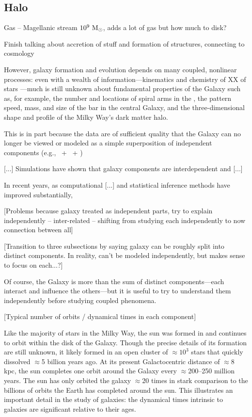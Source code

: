 \subsection{Halo} 

Gas -- Magellanic stream $10^9~\mathrm{M}_\odot$, adds a lot of gas but how much to disk?

Finish talking about accretion of stuff and formation of structures, connecting to cosmology


However, galaxy formation and evolution depends on many coupled, nonlinear processes: even with a wealth of information---kinematics and chemistry of XX of stars \citep{todo}---much is still unknown about fundamental properties of the Galaxy such as, for example, the number and locations of spiral arms in the \mwdisk, the pattern speed, mass, and size of the bar in the central Galaxy, and the three-dimensional shape and profile of the Milky Way's dark matter halo. 

This is in part because the data are of sufficient quality that the Galaxy can no longer be viewed or modeled as a simple superposition of independent components (e.g., \mwdisk\ + \mwbulge\ + \mwhalo)

[...] Simulations have shown that galaxy components are interdependent and [...] \citep{todo}

In recent years, as computational [...] and statistical inference methods have improved substantially, 

[Problems because galaxy treated as independent parts, try to explain independently -- inter-related -- shifting from studying each independently to now connection between all]

[Transition to three subsections by saying galaxy can be roughly split into distinct components. In reality, can't be modeled independently, but makes sense to focus on each...?]


Of course, the Galaxy is more than the sum of distinct components---each interact and influence the others---but it is useful to try to understand them independently before studying coupled phenomena. 



[Typical number of orbits / dynamical times in each component]

Like the majority of stars in the Milky Way, the sun was formed in and continues to orbit within the disk of the Galaxy. Though the precise details of its formation are still unknown, it likely formed in an open cluster of $\approx$$10^3$ stars that quickly dissolved $\approx$5 billion years ago. At its present Galactocentric distance of $\approx$8 kpc, the sun completes one orbit around the Galaxy every $\approx$200--250 million years. The sun has only orbited the galaxy $\approx$20 times in stark comparison to the billions of orbits the Earth has completed around the sun. This illustrates an important detail in the study of galaxies: the dynamical times intrinsic to galaxies are significant relative to their ages.

